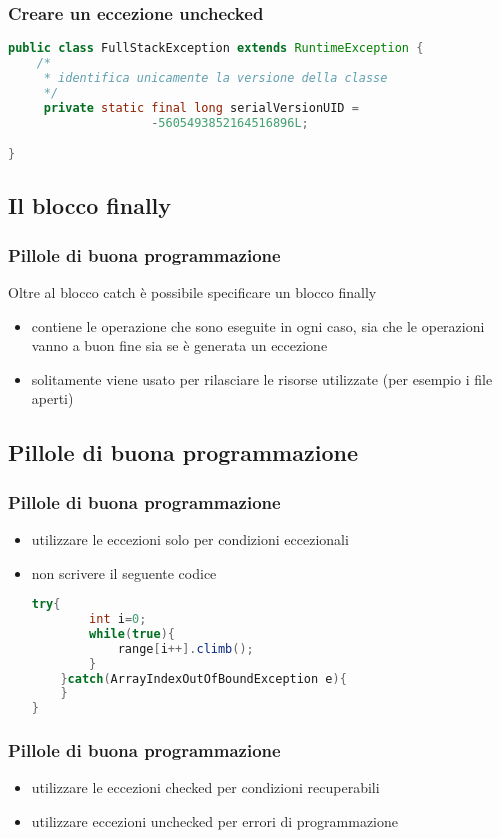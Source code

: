 \documentclass{beamer}
\begin{document}
\begin{frame}[fragile]
\frametitle{Creare un eccezione unchecked}
\begin{lstlisting}[language=Java]
public class FullStackException extends RuntimeException {
    /*
     * identifica unicamente la versione della classe 
     */
     private static final long serialVersionUID = 
	                -5605493852164516896L;

}
\end{lstlisting}
\end{frame}

\subsection{Il blocco finally}
\begin{frame}[fragile]
\frametitle{Pillole di buona programmazione}
Oltre al blocco catch \`e possibile specificare un blocco finally
\begin{itemize}
\item contiene le operazione che sono eseguite in ogni caso, sia che le operazioni vanno a buon fine sia se \`e generata un eccezione
\item solitamente viene usato per rilasciare le risorse utilizzate (per esempio i file aperti)
 \end{itemize}
\end{frame}

\subsection{Pillole di buona programmazione}
\begin{frame}[fragile]
\frametitle{Pillole di buona programmazione}
\begin{itemize}
\item utilizzare le eccezioni solo per condizioni eccezionali
\item non scrivere il seguente codice
\begin{lstlisting}[language=Java]
try{
        int i=0;
        while(true){
            range[i++].climb();
        }
    }catch(ArrayIndexOutOfBoundException e){
    }
}
\end{lstlisting}
\end{itemize}
\end{frame}


\begin{frame}[fragile]
\frametitle{Pillole di buona programmazione}
\begin{itemize}
\item utilizzare le eccezioni checked per condizioni recuperabili 
\item utilizzare eccezioni unchecked per errori di programmazione
\end{itemize}
\end{frame}
\end{document}
